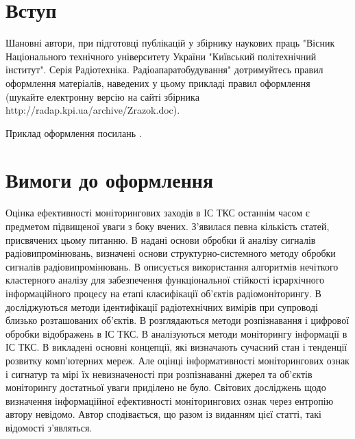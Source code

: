 %
%
%

\section{Вступ}
Шановні автори, при підготовці публікацій у збірнику наукових праць "Вісник Національного технічного університету України "Київський політехнічний інститут". Серія Радіотехніка. Радіоапаратобудування" дотримуйтесь правил оформлення матеріалів, наведених у цьому прикладі правил оформлення (шукайте електронну версію на сайті збірника http://radap.kpi.ua/archive/Zrazok.doc).

Приклад оформлення посилань \cite{radap1354ref1,radap1354ref4}. 


\section{Вимоги до оформлення}

Оцінка ефективності моніторингових заходів в ІС ТКС останнім часом є предметом підвищеної уваги з боку вчених. З’явилася певна кількість статей, присвячених цьому питанню. В \cite{radap1354ref1} надані основи обробки й аналізу сигналів радіовипромінювань, визначені основи структурно-системного методу обробки сигналів радіовипромінювань. В \cite{radap1354ref2} описується використання алгоритмів нечіткого кластерного аналізу для забезпечення функціональної стійкості ієрархічного інформаційного процесу на етапі класифікації об’єктів радіомоніторингу. В \cite{radap1354ref3} досліджуються методи ідентифікації радіотехнічних вимірів при супроводі  близько розташованих об’єктів. В \cite{radap1354ref4} розглядаються методи розпізнавання і цифрової обробки відображень в ІС ТКС. В \cite{radap1354ref5} аналізуються методи моніторингу інформації в ІС ТКС. В \cite{radap1354ref6} викладені основні концепції, які визначають сучасний стан і тенденції розвитку комп’ютерних мереж. Але оцінці інформативності моніторингових ознак і сигнатур та мірі їх невизначеності при розпізнаванні джерел та об’єктів моніторингу достатньої уваги приділено не було. Світових досліджень щодо визначення інформаційної ефективності моніторингових ознак через ентропію автору невідомо. Автор сподівається, що разом із виданням цієї статті, такі відомості з'являться.

